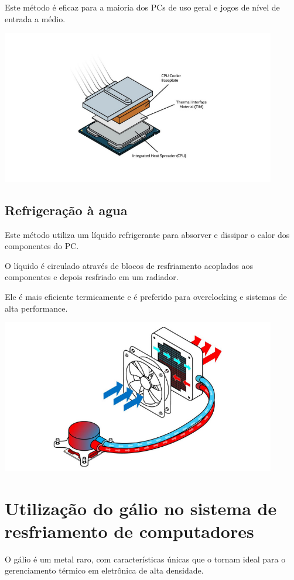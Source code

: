 \documentclass[12pt]{article}
\begin{document}
Este método é eficaz para a maioria dos PCs de uso geral e jogos de nível de entrada a médio.
\begin{adjustbox}{center,caption={Funcionamento básico de refrigeração a ar (Imagem: Intel/Divulgação)},nofloat=figure,vspace=\bigskipamount}
    \includegraphics[width=12cm]{fusca.png}
\end{adjustbox}
\subsection{Refrigeração à agua}
Este método utiliza um líquido refrigerante para absorver e dissipar o calor dos componentes do PC. 

O líquido é circulado através de blocos de resfriamento acoplados aos componentes e depois resfriado em um radiador. 

Ele é mais eficiente termicamente e é preferido para overclocking e sistemas de alta performance.
\begin{adjustbox}{center,caption={Exemplo de refrigeração liquida (Imagem: Intel/Divulgação)},nofloat=figure,vspace=\bigskipamount}
    \includegraphics[width=12cm]{ap.png}
\end{adjustbox}
\section{Utilização do gálio no sistema de resfriamento de computadores}
O gálio é um metal raro, com características únicas que o tornam ideal para o gerenciamento térmico em eletrônica de alta densidade. 
\end{document}
